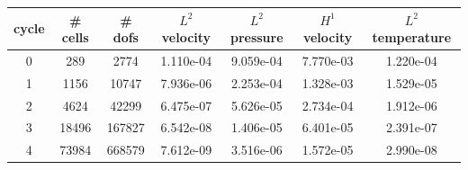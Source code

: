 \documentclass[10pt]{report}
\begin{document}
\begin{table}[H]
\begin{center}
\begin{tabular}{|c|c|c|c|c|c|c|} \hline
cycle & \# cells & \# dofs & $L^2$ velocity & $L^2$ pressure & $H^1$ velocity & $L^2$ temperature\\ \hline
0 & 289 & 2774 & 1.110e-04 & 9.059e-04 & 7.770e-03 & 1.220e-04\\ \hline
1 & 1156 & 10747 & 7.936e-06 & 2.253e-04 & 1.328e-03 & 1.529e-05\\ \hline
2 & 4624 & 42299 & 6.475e-07 & 5.626e-05 & 2.734e-04 & 1.912e-06\\ \hline
3 & 18496 & 167827 & 6.542e-08 & 1.406e-05 & 6.401e-05 & 2.391e-07\\ \hline
4 & 73984 & 668579 & 7.612e-09 & 3.516e-06 & 1.572e-05 & 2.990e-08\\ \hline
\end{tabular}
\end{center}
\end{table}
\end{document}
